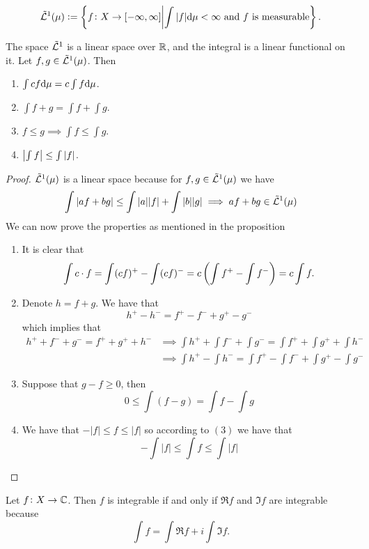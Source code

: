 \documentclass[11pt,a4paper]{article}
\begin{document}
\begin{definition}
  \[
    \tilde{\mathcal{L}}^1(\mu) :=
    \left\{f \colon X \to [-\infty,\infty] \middle\vert \int |f| \mathrm{d} \mu < \infty \text{ and }
    f \text{ is measurable}\right\}.
  \]
\end{definition}
\begin{proposition}
  The space $\tilde{\mathcal{L}}^1$ is a linear space over $\mathbb{R}$, and the integral
  is a linear functional on it.
  Let $f,g \in \tilde{\mathcal{L}}^1(\mu)$. Then
  \begin{enumerate}
    \item[(1)] $\int c f \mathrm{d} \mu = c \int f \mathrm{d} \mu$.
    \item[(2)] $\int f + g = \int f + \int g$.
    \item[(3)] $f \le g \implies \int f \le \int g$.
    \item[(4)] $\left\lvert\int f\right\rvert \le \int\left\lvert f\right\rvert$.
  \end{enumerate}
\end{proposition}
\begin{proof}
  $\tilde{\mathcal{L}}^1(\mu)$ is a linear space because for $f,g \in \tilde{\mathcal{L}}^1(\mu)$
  we have
  \[
    \int |a f + b g| \le
    \int |a| |f| + \int |b| |g| \implies
    a f + b g \in \tilde{\mathcal{L}}^1(\mu)
  \]
  We can now prove the properties as mentioned in the proposition
  \begin{enumerate}
    \item[(1)] It is clear that
      \[
        \int c \cdot f =
        \int (c f)^+ - \int (c f)^- =
        c \del{\int f^+ - \int f^-} =
        c \int f.
      \]
    \item[(2)] Denote $h = f + g$.
    We have that
    \[
      h^+ - h^- =
      f^+ - f^- + g^+ - g^-
    \]
    which implies that
    \begin{align*}
      h^+ + f^- + g^- = f^+ + g^+ + h^- &\implies
      \int h^+ + \int f^- + \int g^- = \int f^+ + \int g^+ + \int h^- 
                                     \\ &\implies
      \int h^+ - \int h^- = \int f^+ - \int f^- + \int g^+ - \int g^-
    \end{align*}
  \item[(3)] Suppose that $g - f \geq 0$, then
    \[
      0 \le \int (f - g) = \int f - \int g
    \]
  \item[(4)] We have that $- |f| \le f \le |f|$ so according to $(3)$ we have
    that
    \[
      - \int |f| \le \int f \le \int |f|
    \]
  \end{enumerate}
\end{proof}
\begin{remark}
  Let $f \colon X \to \mathbb{C}$.
  Then $f$ is integrable if and only if $\Re f$ and $\Im f$ are integrable
  because
  \[
    \int f = \int \Re f + i \int \Im f.
  \]
\end{remark}
\end{document}
